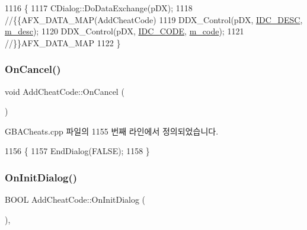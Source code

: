 \begin{DoxyCode}
1116 \{
1117   CDialog::DoDataExchange(pDX);
1118   \textcolor{comment}{//\{\{AFX\_DATA\_MAP(AddCheatCode)}
1119   DDX\_Control(pDX, \mbox{\hyperlink{resource_8h_adb05cf1e74135587a9b3ab93a5152feb}{IDC\_DESC}}, \mbox{\hyperlink{class_add_cheat_code_a5bbe6b54e71db26da7b3abc7449b3342}{m\_desc}});
1120   DDX\_Control(pDX, \mbox{\hyperlink{resource_8h_abb149f0043fd3834639ddb2d80d31723}{IDC\_CODE}}, \mbox{\hyperlink{class_add_cheat_code_a9ae1d05acf10bc6fc8ea8cce2ec2cc6a}{m\_code}});
1121   \textcolor{comment}{//\}\}AFX\_DATA\_MAP}
1122 \}
\end{DoxyCode}
\mbox{\label{class_add_cheat_code_abbf22fde6ad9aa52439e4cb4a3d8418b}} 
\subsubsection{\texorpdfstring{On\+Cancel()}{OnCancel()}}
{\footnotesize\ttfamily void Add\+Cheat\+Code\+::\+On\+Cancel (\begin{DoxyParamCaption}{ }\end{DoxyParamCaption})\hspace{0.3cm}{\ttfamily [protected]}}



G\+B\+A\+Cheats.\+cpp 파일의 1155 번째 라인에서 정의되었습니다.


\begin{DoxyCode}
1156 \{
1157   EndDialog(FALSE);
1158 \}
\end{DoxyCode}
\mbox{\label{class_add_cheat_code_a7818441d921e63c1b0983e86b60beeba}} 
\subsubsection{\texorpdfstring{On\+Init\+Dialog()}{OnInitDialog()}}
{\footnotesize\ttfamily B\+O\+OL Add\+Cheat\+Code\+::\+On\+Init\+Dialog (\begin{DoxyParamCaption}{ }\end{DoxyParamCaption})\hspace{0.3cm}{\ttfamily [protected]}, {\ttfamily [virtual]}}



